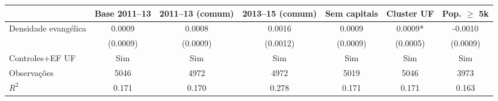 \begin{tabular}{lcccccc}
\toprule
& Base 2011–13 & 2011–13 (comum) & 2013–15 (comum) & Sem capitais & Cluster UF & Pop. $\geq$ 5k \\
\midrule
Densidade evangélica & 0.0009 & 0.0008 & 0.0016 & 0.0009 & 0.0009* & -0.0010 \\
 & (0.0009) & (0.0009) & (0.0012) & (0.0009) & (0.0005) & (0.0009) \\
\midrule
Controles+EF UF & Sim & Sim & Sim & Sim & Sim & Sim \\
Observações & 5046 & 4972 & 4972 & 5019 & 5046 & 3973 \\
$R^2$ & 0.171 & 0.170 & 0.278 & 0.171 & 0.171 & 0.163 \\
\bottomrule
\end{tabular}

